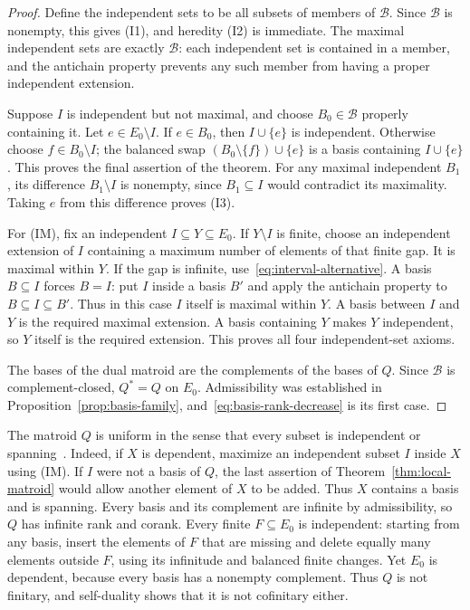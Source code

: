 \begin{proof}
Define the independent sets to be all subsets of members of $\mathcal B$.
Since $\mathcal B$ is nonempty, this gives (I1), and heredity (I2) is
immediate.
The maximal independent sets are exactly $\mathcal B$:
each independent set is contained in a member, and the antichain property
prevents any such member from having a proper independent extension.

Suppose $I$ is independent but not maximal, and choose $B_0\in\mathcal B$
properly containing it.
Let $e\in E_0\setminus I$.
If $e\in B_0$, then $I\cup\{e\}$ is independent.
Otherwise choose $f\in B_0\setminus I$; the balanced swap
$(B_0\setminus\{f\})\cup\{e\}$ is a basis containing $I\cup\{e\}$.
This proves the final assertion of the theorem.
For any maximal independent $B_1$, its difference $B_1\setminus I$ is
nonempty, since $B_1\subseteq I$ would contradict its maximality.
Taking $e$ from this difference proves (I3).

For (IM), fix an independent $I\subseteq Y\subseteq E_0$.
If $Y\setminus I$ is finite, choose an independent extension of $I$
containing a maximum number of elements of that finite gap.
It is maximal within $Y$.
If the gap is infinite, use~\eqref{eq:interval-alternative}.
A basis $B\subseteq I$ forces $B=I$: put $I$ inside a basis $B'$ and
apply the antichain property to $B\subseteq I\subseteq B'$.
Thus in this case $I$ itself is maximal within $Y$.
A basis between $I$ and $Y$ is the required maximal extension.
A basis containing $Y$ makes $Y$ independent, so $Y$ itself is the
required extension.
This proves all four independent-set axioms.

The bases of the dual matroid are the complements of the bases of $Q$.
Since $\mathcal B$ is complement-closed, $Q^*=Q$ on $E_0$.
Admissibility was established in Proposition~\ref{prop:basis-family},
and~\eqref{eq:basis-rank-decrease} is its first case.
\end{proof}

\begin{remark}\label{rem:uniform-local}
The matroid $Q$ is uniform in the sense that every subset is independent
or spanning~\cite{BowlerGeschke2016}.
Indeed, if $X$ is dependent, maximize an independent subset $I$ inside
$X$ using (IM).
If $I$ were not a basis of $Q$, the last assertion of
Theorem~\ref{thm:local-matroid} would allow another element of $X$ to be
added.
Thus $X$ contains a basis and is spanning.
Every basis and its complement are infinite by admissibility, so $Q$
has infinite rank and corank.
Every finite $F\subseteq E_0$ is independent: starting from any basis,
insert the elements of $F$ that are missing and delete equally many
elements outside $F$, using its infinitude and balanced finite changes.
Yet $E_0$ is dependent, because every basis has a nonempty complement.
Thus $Q$ is not finitary, and self-duality shows that it is not cofinitary
either.
\end{remark}

